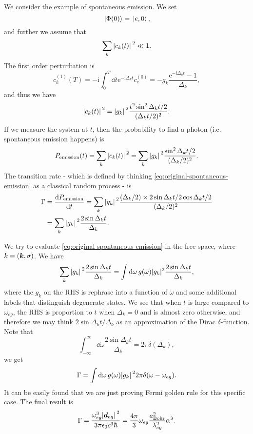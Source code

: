 \documentclass[hyperref, a4paper]{article}
\newcommand*{\ii}{\mathrm{i}}
\newcommand*{\ee}{\mathrm{e}}
\begin{document}
We consider the example of spontaneous emission. We set 
\begin{equation}
    \ket*{\Phi(0)} = \ket*{e, 0},
\end{equation}
and further we assume that 
\begin{equation}
    \sum_k \abs*{c_k(t)}^2 \ll 1.
\end{equation}
The first order perturbation is 
\[
    c^{(1)}_k(T) = - \ii \int_0^T \dd{t} \ee^{- \ii \Delta_k t} c^{(0)}_e = - g_k \frac{\ee^{- \ii \Delta_k t} - 1}{\Delta_k},
\]
and thus we have 
\[
    \abs*{c_k(t)}^2 = \abs*{g_k}^2 \frac{t^2 \sin^2 \Delta_k t / 2}{(\Delta_k t / 2)^2} .
\]
If we measure the system at $t$, then the probability to find a photon (i.e. spontaneous emission happens) is 
\[
    P_\text{emission}(t) = \sum_k \abs*{c_k(t)}^2 = \sum_k \abs*{g_k}^2 \frac{ \sin^2 \Delta_k t / 2}{(\Delta_k / 2)^2} .
\]
The transition rate - which is defined by thinking \eqref{eq:original-spontaneous-emission} as a classical random process - is
\begin{equation}
    \begin{aligned}
        \Gamma &= \dv{P_\text{emission}}{t} = 
        \sum_k \abs*{g_k}^2 \frac{(\Delta_k / 2) \times 2 \sin \Delta_k t / 2 \cos \Delta_k t / 2 }{(\Delta_k / 2)^2} \\
        &= \sum_k \abs*{g_k}^2 \frac{2 \sin \Delta_k t  }{\Delta_k}.
    \end{aligned}
    \label{eq:original-spontaneous-emission}
\end{equation}

We try to evaluate \eqref{eq:original-spontaneous-emission} in the free space, where $k = (\vb*{k}, \sigma)$.
We have 
\[
    \sum_k \abs*{g_k}^2 \frac{2 \sin \Delta_k t  }{\Delta_k} 
    = \int \dd{\omega} g(\omega) |g_k|^2 \frac{2 \sin \Delta_k t}{\Delta_k},
\]
where the $g_k$ on the RHS is rephrase into a function of $\omega$ and some additional labels that distinguish degenerate states.
We see that when $t$ is large compared to $\omega_{eg}$, 
the RHS is proportion to $t$ when $\Delta_k = 0$ and is almost zero otherwise, 
and therefore we may think ${2 \sin \Delta_k t} / {\Delta_k}$ as an approximation of the Dirac $\delta$-function.
Note that 
\[
    \int_{-\infty}^\infty \dd{\omega} \frac{2 \sin \Delta_k t}{\Delta_k} = 2 \pi \delta(\Delta_k),
\]
we get 
\begin{equation}
    \Gamma = \int \dd{\omega} g(\omega) \abs*{g_k}^2 2\pi \delta(\omega - \omega_{eg}).
\end{equation}
It can be easily found that we are just proving Fermi golden rule for this specific case.
The final result is 
\begin{equation}
    \Gamma = \frac{\omega_{eg}^3 \abs*{\vb*{d}_{eg}}^2 }{3 \pi \epsilon_0 c^3 \hbar} 
    = \frac{4 \pi}{3} \omega_{eg} \frac{a_\text{Bohr}^2}{\lambda_{eg}^2} \alpha^3.
    \label{eq:spontaneous-emission-free-space}
\end{equation}
\end{document}
